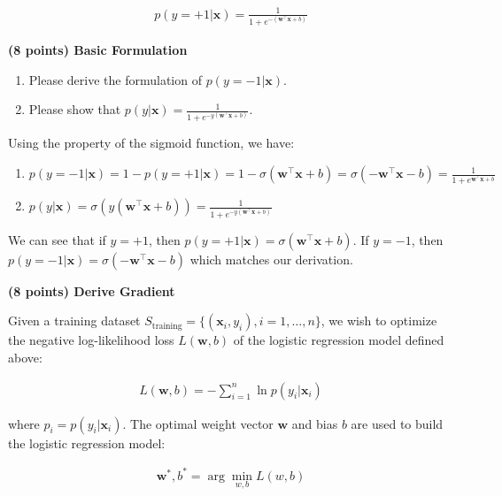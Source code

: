 \documentclass{article}
\newcommand{\x}{\mathbf{x}}
\newcommand{\w}{\mathbf{w}}
\begin{document}
\begin{probset}
\begin{prob}
    \begin{align}
        p(y = +1|\x) = \frac{1}{1 + e^{-(\w^\top \x + b)}}
    \end{align}

    \begin{subprobset}
    \begin{subprob}
        \textbf{(8 points) Basic Formulation} 
        
        \begin{enumerate}
            \item Please derive the formulation of $p(y = -1|\x)$.
            \item Please show that $p(y|\x) = \frac{1}{1 + e^{-y(\w^\top \x + b)}}$.
        \end{enumerate}

        \begin{soln}
            Using the property of the sigmoid function, we have:
            \begin{enumerate}
                \item $p(y = -1|\x) = 1 - p(y = +1|\x) = 1 - \sigma(\w^\top \x + b) = \sigma(-\w^\top \x - b) = \frac{1}{1 + e^{\w^\top \x + b}}$
                \item $p(y|\x) = \sigma(y(\w^\top \x + b)) = \frac{1}{1 + e^{-y(\w^\top \x + b)}}$
            \end{enumerate}
            We can see that if $y = +1$, then $p(y = +1|\x) = \sigma(\w^\top \x + b)$. If $y = -1$, then $p(y = -1|\x) = \sigma(-\w^\top \x - b)$ which matches our derivation.
        \end{soln}
    \end{subprob}

    \newpage

    \begin{subprob}
        \textbf{(8 points) Derive Gradient}

        Given a training dataset $S_\text{training} = \{(\x_i, y_i), i = 1, \ldots, n\}$, we wish to optimize the negative log-likelihood loss $L(\w, b)$ of the logistic regression model defined above:

        \begin{align}
            L(\w, b) = -\sum_{i=1}^n \ln p(y_i|\x_i)
        \end{align}

        where $p_i = p(y_i|\x_i)$. The optimal weight vector $\w$ and bias $b$ are used to build the
        logistic regression model:

        \begin{align}
            \w^*, b^* = \arg \min_{w, b} L(w, b)
        \end{align}


\end{subprob}
\end{subprobset}
\end{prob}
\end{probset}
\end{document}
